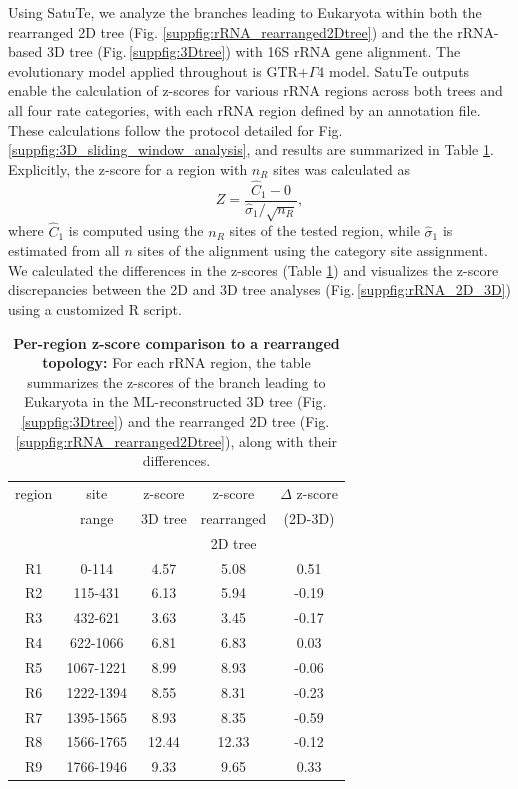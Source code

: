 \begin{appendices}
Using SatuTe, we analyze the branches leading to Eukaryota within both the rearranged 2D tree (Fig. \ref{suppfig:rRNA_rearranged2Dtree}) and the the rRNA-based  3D tree (Fig.\,\ref{suppfig:3Dtree}) with 16S rRNA gene alignment. The evolutionary model applied throughout is GTR+$\Gamma 4$ model. SatuTe outputs enable the calculation of z-scores for various rRNA regions across both trees and all four rate categories, with each rRNA region defined by an annotation file. These calculations follow the protocol detailed for Fig.\,\ref{suppfig:3D_sliding_window_analysis}, and results are summarized in Table \ref{supptab:rRNA_2D_3D}. Explicitly, the z-score for a region with $n_R$ sites was calculated as
\begin{equation}
Z = \frac{\hat{C}_1-0}
{
\hat\sigma_1/\sqrt{n_R}
},
\end{equation}
where $\hat{C}_1$ is computed using the $n_R$ sites of the tested region, while $\hat\sigma_1$ is estimated from all $n$ sites of the alignment using the category site assignment. We calculated the differences in the z-scores (Table \ref{supptab:rRNA_2D_3D}) and visualizes the z-score discrepancies between the 2D and 3D tree analyses (Fig.\,\ref{suppfig:rRNA_2D_3D}) using a customized R script.

\begin{table}[ht]
    \centering
    \begin{tabular}{|c|c|c|c|c|}
\hline
region&site& z-score & z-score& $\Delta$ z-score\\
&range&3D tree & rearranged & (2D-3D)\\
&& & 2D tree & \\
\hline
R1&0-114&4.57&5.08&0.51\\
R2&115-431&6.13&5.94&-0.19\\
R3&432-621&3.63&3.45&-0.17\\
R4&622-1066&6.81&6.83&0.03\\
R5&1067-1221&8.99&8.93&-0.06\\
R6&1222-1394&8.55&8.31&-0.23\\
R7&1395-1565&8.93&8.35&-0.59\\
R8&1566-1765&12.44&12.33&-0.12\\
R9&1766-1946&9.33&9.65&0.33\\
\hline
    \end{tabular}
    \vspace{0.25cm}
    \caption{\textbf{Per-region z-score comparison to a rearranged topology:} For each rRNA region, the table summarizes the z-scores of the branch leading to Eukaryota in the ML-reconstructed 3D tree (Fig.\,\ref{suppfig:3Dtree}) and the rearranged 2D tree (Fig.\,\ref{suppfig:rRNA_rearranged2Dtree}), along with their differences.}
    \label{supptab:rRNA_2D_3D}
    \end{table}






\end{appendices}
